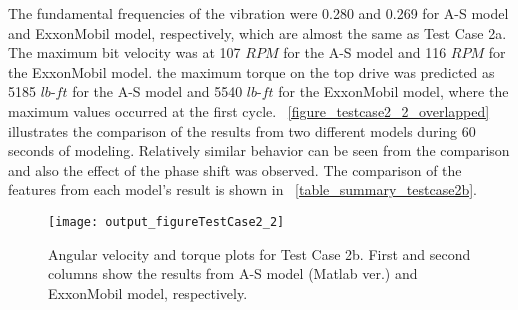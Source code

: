 The fundamental frequencies of the vibration were 0.280 and 0.269 for A-S model and ExxonMobil model, respectively, which are almost the same as Test Case 2a. The maximum bit velocity was at 107 $RPM$ for the A-S model and 116 $RPM$ for the ExxonMobil model. the maximum torque on the top drive was predicted as 5185 $lb\mbox{-}ft$ for the A-S model and 5540 $lb\mbox{-}ft$ for the ExxonMobil model, where the maximum values occurred at the first cycle. \figurename~\ref{figure_testcase2_2_overlapped} illustrates the comparison of the results from two different models during 60 seconds of modeling. Relatively similar behavior can be seen from the comparison and also the effect of the phase shift was observed. The comparison of the features from each model's result is shown in \tablename~\ref{table_summary_testcase2b}.

\begin{figure}
  \centering
  \texttt{[image: output\_figureTestCase2\_2]}
  \caption[Angular velocity and torque plots for Test Case 2b]{Angular velocity and torque plots for Test Case 2b. First and second columns show the results from A-S model (Matlab ver.) and ExxonMobil model, respectively.}\label{figure_testcase2_2}
\end{figure}

